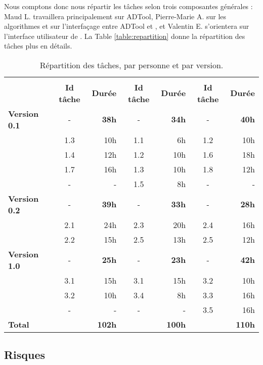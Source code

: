 		Nous comptons donc nous répartir les tâches selon trois composantes générales : Maud L. travaillera principalement sur ADTool, Pierre-Marie A. sur les algorithmes et sur l'interfaçage entre ADTool et \glasir{}, et Valentin E. s'orientera sur l'interface utilisateur de \glasir{}. La {\sc Table} \ref{table:repartition} donne la répartition des tâches plus en détails.
			


		\begin{table}[H]
			\centering
			\begin{tabular}{|l|c|r||c|r||c|r|}
				\hline
				\multirow{2}{*}{} & \nomRepart{Pierre-Marie A.} & \nomRepart{Valentin E.} & \nomRepartt{Maud L.}\\
				\cline{2-7}
				 & {\bf Id tâche} & {\bf Durée} & {\bf Id tâche} & {\bf Durée} & {\bf Id tâche} & {\bf Durée}\\
				\hline
				{\bf Version 0.1} & - & {\bf 38h} & - & {\bf 34h} & - & {\bf 40h}\\
				 & 1.3 & 10h & 1.1 & 6h & 1.2 & 10h\\
				 & 1.4 & 12h & 1.2 & 10h & 1.6 & 18h\\
				 & 1.7 & 16h & 1.3 & 10h & 1.8 & 12h\\
				 & - & - & 1.5 & 8h & - & -\\
				\hline
				{\bf Version 0.2} & - & {\bf 39h} & - & {\bf 33h} & - & {\bf 28h}\\
				 & 2.1 & 24h & 2.3 & 20h & 2.4 & 16h\\
				 & 2.2 & 15h & 2.5 & 13h & 2.5 & 12h\\
				\hline
				{\bf Version 1.0} & - & {\bf 25h} & - & {\bf 23h} & - & {\bf 42h}\\
				 & 3.1 & 15h & 3.1 & 15h & 3.2 & 10h\\
				 & 3.2 & 10h & 3.4 & 8h & 3.3 & 16h\\
				 & - & - & - & - & 3.5 & 16h\\
				\hline
				{\bf Total} & \multicolumn{2}{r||}{{\bf 102h}} & \multicolumn{2}{r||}{{\bf 100h}} & \multicolumn{2}{r|}{{\bf 110h}}\\
				\hline
			\end{tabular}
			\caption{Répartition des tâches, par personne et par version.}
			\label{table:repartition}
			\label{tab:repartition}
		\end{table}


	\subsection{Risques}
		\label{subsec:risques}

